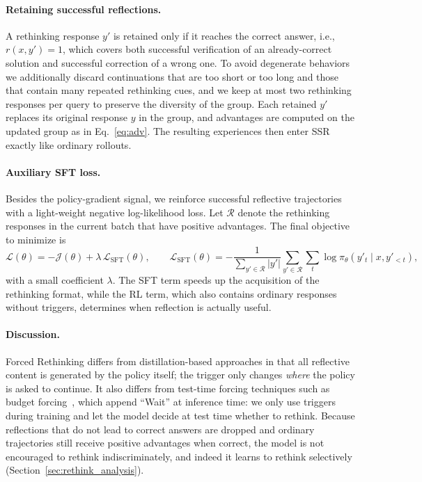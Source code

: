 \documentclass{article}
\begin{document}
\paragraph{Retaining successful reflections.} A rethinking response $y'$ is retained only if it reaches the correct answer, i.e., $r(x,y')=1$, which covers both successful verification of an already-correct solution and successful correction of a wrong one. To avoid degenerate behaviors we additionally discard continuations that are too short or too long and those that contain many repeated rethinking cues, and we keep at most two rethinking responses per query to preserve the diversity of the group. Each retained $y'$ replaces its original response $y$ in the group, and advantages are computed on the updated group as in Eq.~\eqref{eq:adv}. The resulting experiences then enter SSR exactly like ordinary rollouts.

\paragraph{Auxiliary SFT loss.} Besides the policy-gradient signal, we reinforce successful reflective trajectories with a light-weight negative log-likelihood loss. Let $\mathcal{R}$ denote the rethinking responses in the current batch that have positive advantages. The final objective to minimize is
\begin{equation}
    \mathcal{L}(\theta) = -\mathcal{J}(\theta) + \lambda\,\mathcal{L}_\text{SFT}(\theta),\qquad \mathcal{L}_\text{SFT}(\theta) = -\frac{1}{\sum_{y'\in\mathcal{R}}|y'|}\sum_{y'\in\mathcal{R}}\sum_{t}\log\pi_\theta(y'_t\mid x,y'_{<t}),
    \label{eq:loss}
\end{equation}
with a small coefficient $\lambda$. The SFT term speeds up the acquisition of the rethinking format, while the RL term, which also contains ordinary responses without triggers, determines when reflection is actually useful.

\paragraph{Discussion.} Forced Rethinking differs from distillation-based approaches in that all reflective content is generated by the policy itself; the trigger only changes \emph{where} the policy is asked to continue. It also differs from test-time forcing techniques such as budget forcing~\citep{s1}, which append ``Wait'' at inference time: we only use triggers during training and let the model decide at test time whether to rethink. Because reflections that do not lead to correct answers are dropped and ordinary trajectories still receive positive advantages when correct, the model is not encouraged to rethink indiscriminately, and indeed it learns to rethink selectively (Section~\ref{sec:rethink_analysis}).
\end{document}
